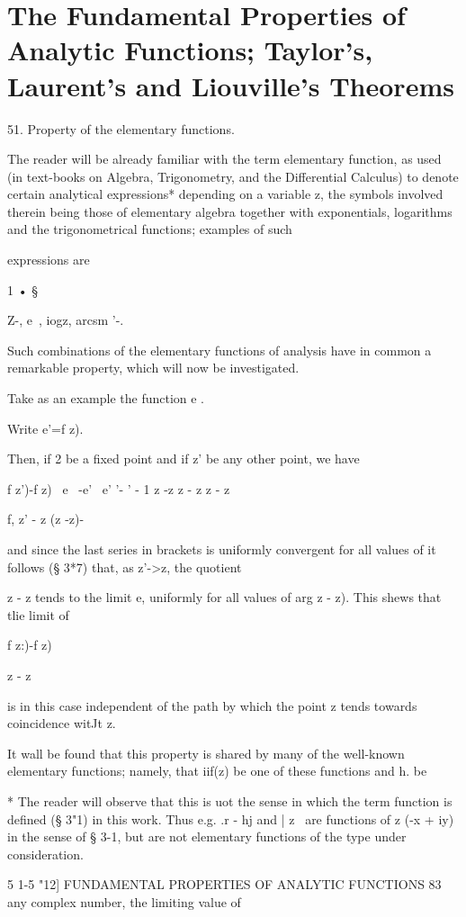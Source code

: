 \chapter{The Fundamental Properties of Analytic Functions; 
Taylor's, Laurent's and Liouville's Theorems} 

51. Property of the elementary functions.

The reader will be already familiar with the term elementary function,
as used (in text-books on Algebra, Trigonometry, and the Differential
Calculus) to denote certain analytical expressions* depending on a
variable z, the symbols involved therein being those of elementary
algebra together with exponentials, logarithms and the trigonometrical
functions; examples of such

expressions are

1 • §

Z-, e~, iogz, arcsm '-.

Such combinations of the elementary functions of analysis have in
common a remarkable property, which will now be investigated.

Take as an example the function e .

Write e'=f z).

Then, if 2 be a fixed point and if z' be any other point, we have

f z')-f z) \ e~ -e' \, e' '- ' - 1 z -z z - z z - z

f, z' - z (z -z)-

and since the last series in brackets is uniformly convergent for all
values of it follows (§ 3*7) that, as z'->z, the quotient

z - z tends to the limit e, uniformly for all values of arg z - z).
This shews that tlie limit of

f z:)-f z)

z - z

is in this case independent of the path by which the point z tends
towards coincidence witJt z.

It wall be found that this property is shared by many of the
well-known elementary functions; namely, that iif(z) be one of these
functions and h. be

* The reader will observe that this is uot the sense in which the term
function is defined (§ 3"1) in this work. Thus e.g. .r - hj and | z \
are functions of z (-x + iy) in the sense of § 3-1, but are not
elementary functions of the type under consideration.

5 1-5 "12] FUNDAMENTAL PROPERTIES OF ANALYTIC FUNCTIONS 83 any complex
number, the limiting value of

